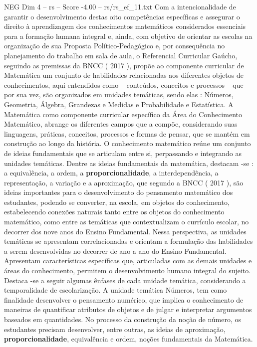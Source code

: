 \begin{textsample}{NEG Dim 4 – rs – Score -4.00 – rs/rs\_ef\_11.txt}
Com a intencionalidade de garantir o desenvolvimento destas oito competências específicas e assegurar o direito à aprendizagem dos conhecimentos matemáticos considerados essenciais para a formação humana integral e, ainda, com objetivo de orientar as escolas na organização de sua Proposta Político-Pedagógico e, por consequência no planejamento do trabalho em sala de aula, o Referencial Curricular Gaúcho, seguindo as premissas da BNCC ( 2017 ), propõe ao componente curricular de Matemática um conjunto de habilidades relacionadas aos diferentes objetos de conhecimentos, aqui entendidos como – conteúdos, conceitos e processos – que por sua vez, são organizados em unidades temáticas, sendo elas : Números, Geometria, Álgebra, Grandezas e Medidas e Probabilidade e Estatística.
A Matemática como componente curricular específico da Área do Conhecimento Matemático, abrange os diferentes campos que a compõe, considerando suas linguagens, práticas, conceitos, processos e formas de pensar, que se mantém em construção ao longo da história.
O conhecimento matemático reúne um conjunto de ideias fundamentais que se articulam entre si, perpassando e integrando as unidades temáticas.
Dentre as ideias fundamentais da matemática, destacam -se : a equivalência, a ordem, a \textbf{proporcionalidade}, a interdependência, a representação, a variação e a aproximação, que segundo a BNCC ( 2017 ), são ideias importantes para o desenvolvimento do pensamento matemático dos estudantes, podendo se converter, na escola, em objetos do conhecimento, estabelecendo conexões naturais tanto entre os objetos do conhecimento matemático, como entre as temáticas que contextualizam o currículo escolar, no decorrer dos nove anos do Ensino Fundamental.
Nessa perspectiva, as unidades temáticas se apresentam correlacionadas e orientam a formulação das habilidades a serem desenvolvidas no decorrer de ano a ano do Ensino Fundamental.
Apresentam características específicas que, articuladas com as demais unidades e áreas do conhecimento, permitem o desenvolvimento humano integral do sujeito.
Destaca -se a seguir algumas ênfases de cada unidade temática, considerando a temporalidade de escolarização.
A unidade temática Números, tem como finalidade desenvolver o pensamento numérico, que implica o conhecimento de maneiras de quantificar atributos de objetos e de julgar e interpretar argumentos baseados em quantidades.
No processo da construção da noção de número, os estudantes precisam desenvolver, entre outras, as ideias de aproximação, \textbf{proporcionalidade}, equivalência e ordem, noções fundamentais da Matemática.

\end{textsample}
